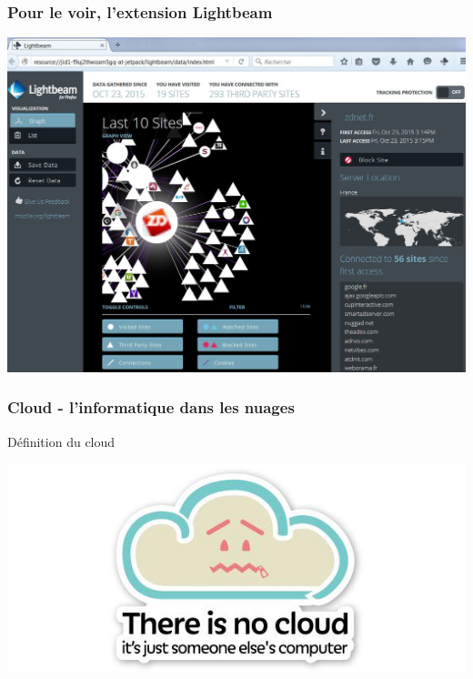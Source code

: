 \documentclass{beamer}
\begin{document}
\begin{frame}
\frametitle{Pour le voir, l'extension Lightbeam}
\includegraphics[scale=0.45] {./images/Lightbeam.jpg} 

\end{frame}

\begin{frame}
\frametitle{Cloud - l'informatique dans les nuages}
\begin{block}{Définition du cloud}
\begin{center}
\includegraphics[scale=0.5] {./images/cloud.png} 
\end{center}
\end{block}
\end{frame}
\end{document}
